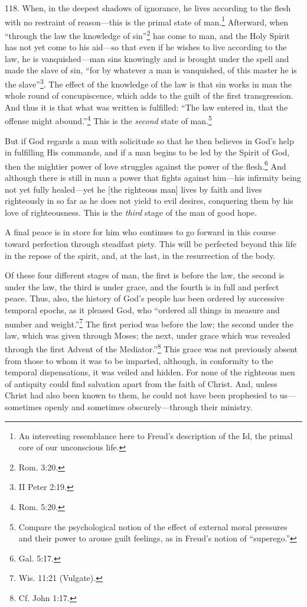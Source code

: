 118. When, in the deepest shadows of ignorance, he lives according to the flesh with no restraint of reason—this is the primal state of man.\footnote{An interesting resemblance here to Freud's description of the Id, the primal core of our unconscious life.} Afterward, when ``through the law the knowledge of sin''\footnote{Rom. 3:20.} has come to man, and the Holy Spirit has not yet come to his aid—so that even if he wishes to live according to the law, he is vanquished—man sins knowingly and is brought under the spell and made the slave of sin, ``for by whatever a man is vanquished, of this master he is the slave''\footnote{II Peter 2:19.}. The effect of the knowledge of the law is that sin works in man the whole round of concupiscence, which adds to the guilt of the first transgression. And thus it is that what was written is fulfilled: ``The law entered in, that the offense might abound.''\footnote{Rom. 5:20.} This is the \emph{second} state of man.\footnote{Compare the psychological notion of the effect of external moral pressures and their power to arouse guilt feelings, as in Freud's notion of ``superego.''}

But if God regards a man with solicitude so that he then believes in God's help in fulfilling His commands, and if a man begins to be led by the Spirit of God, then the mightier power of love struggles against the power of the flesh.\footnote{Gal. 5:17.} And although there is still in man a power that fights against him—his infirmity being not yet fully healed—yet he [the righteous man] lives by faith and lives righteously in so far as he does not yield to evil desires, conquering them by his love of righteousness. This is the \emph{third} stage of the man of good hope.

A final peace is in store for him who continues to go forward in this course toward perfection through steadfast piety. This will be perfected beyond this life in the repose of the spirit, and, at the last, in the resurrection of the body.

Of these four different stages of man, the first is before the law, the second is under the law, the third is under grace, and the fourth is in full and perfect peace. Thus, also, the history of God's people has been ordered by successive temporal epochs, as it pleased God, who ``ordered all things in measure and number and weight.''\footnote{Wis. 11:21 (Vulgate).} The first period was before the law; the second under the law, which was given through Moses; the next, under grace which was revealed through the first Advent of the Mediator.''\footnote{Cf. John 1:17.} This grace was not previously absent from those to whom it was to be imparted, although, in conformity to the temporal dispensations, it was veiled and hidden. For none of the righteous men of antiquity could find salvation apart from the faith of Christ. And, unless Christ had also been known to them, he could not have been prophesied to us—sometimes openly and sometimes obscurely—through their ministry.

